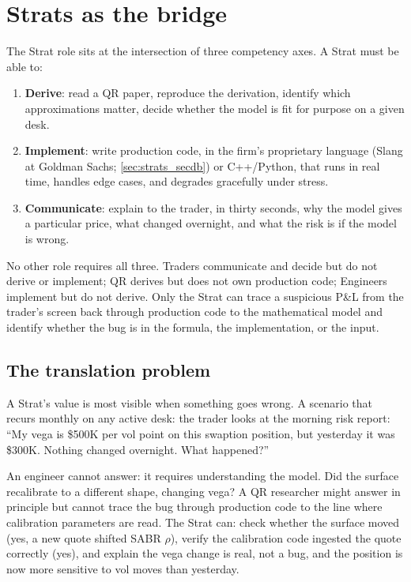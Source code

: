 \section{Strats as the bridge}
\label{sec:strats_bridge}

The Strat role sits at the intersection of three competency axes.  A
Strat must be able to:

\begin{enumerate}
  \item \textbf{Derive}: read a QR paper, reproduce the derivation,
    identify which approximations matter, decide whether the model is
    fit for purpose on a given desk.
  \item \textbf{Implement}: write production code, in the firm's
    proprietary language (Slang at Goldman Sachs;
    \cref{sec:strats_secdb}) or C++/Python, that runs in real
    time, handles edge cases, and degrades gracefully under stress.
  \item \textbf{Communicate}: explain to the trader, in thirty
    seconds, why the model gives a particular price, what changed
    overnight, and what the risk is if the model is wrong.
\end{enumerate}

No other role requires all three.  Traders communicate and decide
but do not derive or implement; QR derives but does not own
production code; Engineers implement but do not derive.  Only the
Strat can trace a suspicious P\&L from the trader's screen back
through production code to the mathematical model and identify
whether the bug is in the formula, the implementation, or the input.

\subsection{The translation problem}

A Strat's value is most visible when something goes wrong.  A
scenario that recurs monthly on any active desk: the trader looks
at the morning risk report: ``My vega is \$500K per vol point on
this swaption position, but yesterday it was \$300K.  Nothing
changed overnight.  What happened?''

An engineer cannot answer: it requires understanding the model.
Did the surface recalibrate to a different shape, changing vega?  A
QR researcher might answer in principle but cannot trace the bug
through production code to the line where calibration parameters
are read.  The Strat can: check whether the surface moved (yes, a
new quote shifted SABR $\rho$), verify the calibration code ingested
the quote correctly (yes), and explain the vega change is real, not
a bug, and the position is now more sensitive to vol moves than
yesterday.

